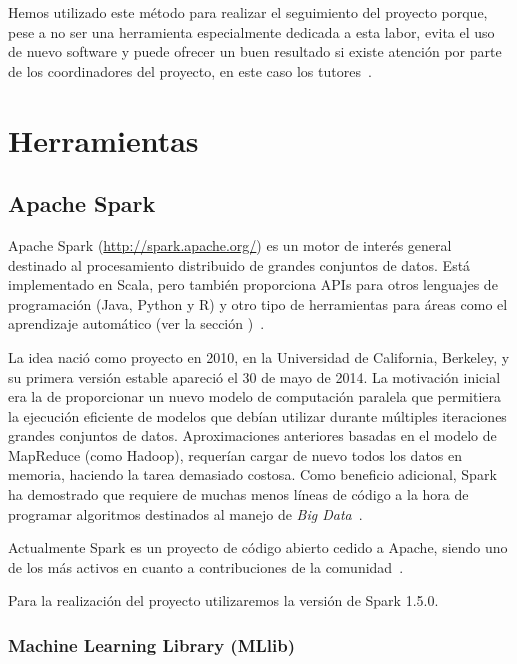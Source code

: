 Hemos utilizado este método para realizar el seguimiento del proyecto porque, pese a no ser una herramienta especialmente dedicada a esta labor, evita el uso de nuevo software y puede ofrecer un buen resultado si existe atención por parte de los coordinadores del proyecto, en este caso los tutores~\cite{WhyIssues}.


\section{Herramientas}

\subsection{Apache Spark}\label{sec:DefSpark}

Apache Spark (\url{http://spark.apache.org/}) es un motor de interés general destinado al procesamiento distribuido de grandes conjuntos de datos. Está implementado en Scala, pero también proporciona APIs para otros lenguajes de programación (Java, Python y R) y otro tipo de herramientas para áreas como el aprendizaje automático (ver la sección )~\cite{SparkDoc}.

La idea nació como proyecto en 2010, en la Universidad de California, Berkeley, y su primera versión estable apareció el 30 de mayo de 2014. La motivación inicial era la de proporcionar un nuevo modelo de computación paralela que permitiera la ejecución eficiente de modelos que debían utilizar durante múltiples iteraciones grandes conjuntos de datos. Aproximaciones anteriores basadas en el modelo de MapReduce (como Hadoop), requerían cargar de nuevo todos los datos en memoria, haciendo la tarea demasiado costosa. Como beneficio adicional, Spark ha demostrado que requiere de muchas menos líneas de código a la hora de programar algoritmos destinados al manejo de \textit{Big Data}~\cite{SparkPaper}.

Actualmente Spark es un proyecto de código abierto cedido a Apache, siendo uno de los más activos en cuanto a contribuciones de la comunidad~\cite{ApacheContributions}. 

Para la realización del proyecto utilizaremos la versión de Spark 1.5.0.

\subsubsection{Machine Learning Library (MLlib)}\label{MLib}


